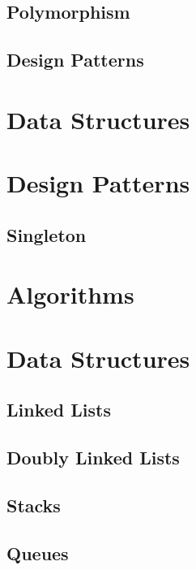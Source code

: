 \documentclass[10pt,a4paper,titlepage]{book}
\begin{document}
\section{Polymorphism}

\vfill
\pagebreak
\section{Design Patterns}

\vfill
\pagebreak
\chapter{Data Structures}

\vfill
\pagebreak
\chapter{Design Patterns}

\vfill
\pagebreak
\section{Singleton}

\vfill
\pagebreak
\chapter{Algorithms}

\vfill
\pagebreak
\chapter{Data Structures}

\vfill
\pagebreak
\section{Linked Lists}

\vfill
\pagebreak
\section{Doubly Linked Lists}

\vfill
\pagebreak
\section{Stacks}

\vfill
\pagebreak
\section{Queues}

\vfill
\pagebreak
\end{document}
